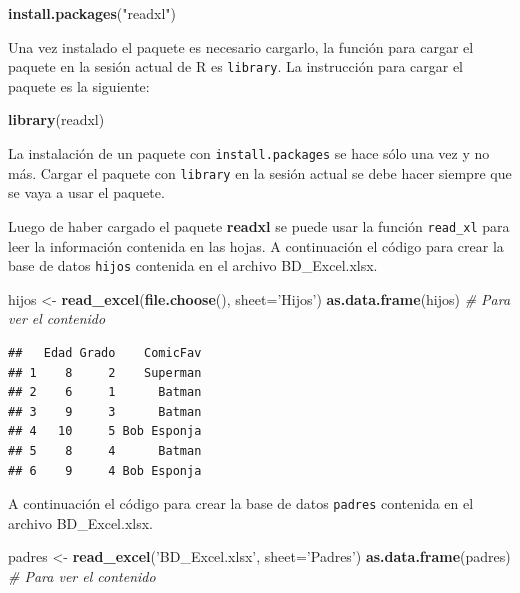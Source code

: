 \documentclass[10pt,]{krantz}
\makeatletter
\newenvironment{Shaded}{\begin{snugshade}}{\end{snugshade}}
\newcommand{\KeywordTok}[1]{\textcolor[rgb]{0.13,0.29,0.53}{\textbf{#1}}}
\newcommand{\DataTypeTok}[1]{\textcolor[rgb]{0.13,0.29,0.53}{#1}}
\newcommand{\StringTok}[1]{\textcolor[rgb]{0.31,0.60,0.02}{#1}}
\newcommand{\CommentTok}[1]{\textcolor[rgb]{0.56,0.35,0.01}{\textit{#1}}}
\newcommand{\NormalTok}[1]{#1}
\let\proglang=\textsf
\newenvironment{kframe}{%
\medskip{}
\setlength{\fboxsep}{.8em}
 \def\at@end@of@kframe{}%
 \ifinner\ifhmode%
  \def\at@end@of@kframe{\end{minipage}}%
  \begin{minipage}{\columnwidth}%
 \fi\fi%
 \def\FrameCommand##1{\hskip\@totalleftmargin \hskip-\fboxsep
 \colorbox{shadecolor}{##1}\hskip-\fboxsep
     \hskip-\linewidth \hskip-\@totalleftmargin \hskip\columnwidth}%
 \MakeFramed {\advance\hsize-\width
   \@totalleftmargin\z@ \linewidth\hsize
   \@setminipage}}%
 {\par\unskip\endMakeFramed%
 \at@end@of@kframe}
\renewenvironment{Shaded}{\begin{kframe}}{\end{kframe}}
\let\BeginKnitrBlock\begin \let\EndKnitrBlock\end
\makeatother
\begin{document}
\begin{Shaded}
\begin{Highlighting}[]
\KeywordTok{install.packages}\NormalTok{(}\StringTok{"readxl"}\NormalTok{)}
\end{Highlighting}
\end{Shaded}

Una vez instalado el paquete es necesario cargarlo, la función para
cargar el paquete en la sesión actual de \proglang{R} es
\texttt{library}. La instrucción para cargar el paquete es la siguiente:

\begin{Shaded}
\begin{Highlighting}[]
\KeywordTok{library}\NormalTok{(readxl)}
\end{Highlighting}
\end{Shaded}

\BeginKnitrBlock{rmdwarning}
La instalación de un paquete con \texttt{install.packages} se hace sólo
una vez y no más. Cargar el paquete con \texttt{library} en la sesión
actual se debe hacer siempre que se vaya a usar el paquete.
\EndKnitrBlock{rmdwarning}

Luego de haber cargado el paquete \textbf{readxl} se puede usar la
función \texttt{read\_xl} para leer la información contenida en las
hojas. A continuación el código para crear la base de datos
\texttt{hijos} contenida en el archivo BD\_Excel.xlsx.

\begin{Shaded}
\begin{Highlighting}[]
\NormalTok{hijos <-}\StringTok{ }\KeywordTok{read_excel}\NormalTok{(}\KeywordTok{file.choose}\NormalTok{(), }\DataTypeTok{sheet=}\StringTok{'Hijos'}\NormalTok{)}
\KeywordTok{as.data.frame}\NormalTok{(hijos)  }\CommentTok{# Para ver el contenido}
\end{Highlighting}
\end{Shaded}

\begin{verbatim}
##   Edad Grado    ComicFav
## 1    8     2    Superman
## 2    6     1      Batman
## 3    9     3      Batman
## 4   10     5 Bob Esponja
## 5    8     4      Batman
## 6    9     4 Bob Esponja
\end{verbatim}

A continuación el código para crear la base de datos \texttt{padres}
contenida en el archivo BD\_Excel.xlsx.

\begin{Shaded}
\begin{Highlighting}[]
\NormalTok{padres <-}\StringTok{ }\KeywordTok{read_excel}\NormalTok{(}\StringTok{'BD_Excel.xlsx'}\NormalTok{, }\DataTypeTok{sheet=}\StringTok{'Padres'}\NormalTok{)}
\KeywordTok{as.data.frame}\NormalTok{(padres)  }\CommentTok{# Para ver el contenido}
\end{Highlighting}
\end{Shaded}
\end{document}
